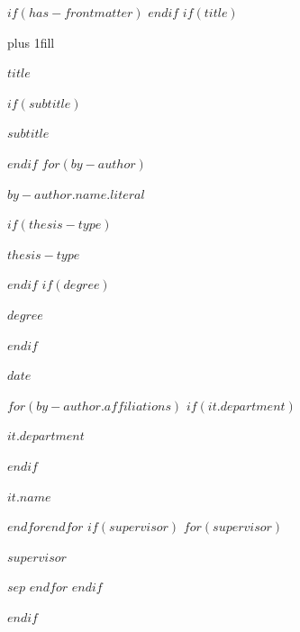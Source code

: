 $if(has-frontmatter)$
\frontmatter
$endif$
$if(title)$
\cleardoublepage
\thispagestyle{empty}
{\centering
\hbox{}\vskip 0cm plus 1fill
{\Huge\bfseries $title$ \par}
$if(subtitle)$
\vspace{3ex}
{\Large\bfseries $subtitle$ \par}
$endif$
\vspace{12ex}
$for(by-author)$
{\Large\bfseries $by-author.name.literal$ \par}
\vspace{3ex}
$if(thesis-type)$
{\bfseries\large $thesis-type$ \par}
\vspace{3ex}
$endif$
$if(degree)$
{\bfseries\large $degree$ \par}
\vspace{3ex}
$endif$
{\bfseries\large $date$ \par}
\vspace{12ex}
$for(by-author.affiliations)$%
$if(it.department)$%
{\bfseries\large $it.department$ \par}
\vspace{3ex}
$endif$%
{\bfseries\large $it.name$ \par}
$endfor$$endfor$%
$if(supervisor)$
\vspace{12ex}
$for(supervisor)$
{\large $supervisor$ \par}
$sep$\vspace{1ex}
$endfor$
$endif$
}
$endif$
